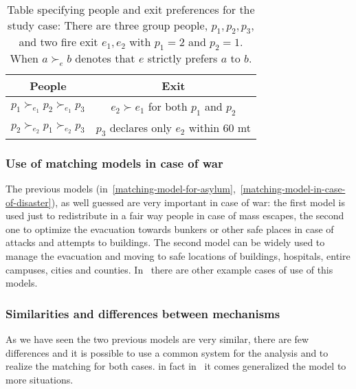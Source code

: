 \documentclass[letterpaper]{article} %
\begin{document}
    \begin{table}[!htb]
        \begin{tabular}{c|c}
            \hline People                                             & Exit                                                       \\
            \hline\( p_{1} \succ_{e_{1}} p_{2} \succ_{e_{1}} p_{3} \) & \( e_{2} \succ e_{1} \) for both \( p_{1} \) and \( p_{2} \) \\
            \( p_{2} \succ_{e_{2}} p_{1} \succ_{e_{2}} p_{3} \)       & \( p_{3} \) declares only \( e_{2} \) within 60 mt         \\
            \hline
        \end{tabular}
        \caption{Table specifying people and exit preferences for
            the study case: There are three group people, \( p _ { 1 } , p _ { 2 } , p _ { 3 } \), and two fire exit
            \( e _ { 1 } , e _ { 2 } \) with \( p _ { 1 } = 2 \) and \( p _ { 2 } = 1 \).
            When \( a \succ_{e} b \) denotes that \( e \) strictly prefers \( a \) to \( b \).}
        \label{tab:people-exit}
    \end{table}

    \subsubsection{Use of matching models in case of war}\label{use-of-matching-model-in-case-of-war}%
    The previous models (in~\ref{matching-model-for-asylum},~\ref{matching-model-in-case-of-disaster}), as well guessed are very important in case of war: the first model is used just
    to redistribute in a fair way people in case of mass escapes, the second one to optimize the evacuation
    towards bunkers or other safe places in case of attacks and attempts to buildings.
    The second model can be widely used to manage the evacuation and moving to safe locations of buildings, hospitals,
    entire campuses, cities and counties.
    In~\citet{delacretaz_2020,delacretaz_2019,delacretaz_2016}   there are other example cases of use of this models.

    \subsubsection{Similarities and differences between mechanisms}

    As we have seen the two previous models are very similar, there are few differences and it is possible to use a
    common system for the analysis and to realize the matching for both cases.
    in fact in~\citet{delacretaz_2020} it comes generalized the model to more situations.
\end{document}
